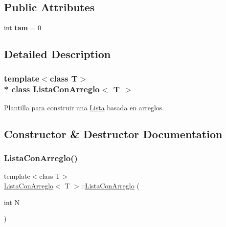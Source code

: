 \subsection*{Public Attributes}
\begin{DoxyCompactItemize}
\item 
\hypertarget{class_lista_con_arreglo_a7b1a9c6334db75f4ffb023a95b01e3f4}{}\label{class_lista_con_arreglo_a7b1a9c6334db75f4ffb023a95b01e3f4} 
int {\bfseries tam} = 0
\end{DoxyCompactItemize}


\subsection{Detailed Description}
\subsubsection*{template$<$class T$>$\\*
class Lista\+Con\+Arreglo$<$ T $>$}

Plantilla para construir una \hyperlink{class_lista}{Lista} basada en arreglos. 

\subsection{Constructor \& Destructor Documentation}
\hypertarget{class_lista_con_arreglo_a9541812a0019b76c6529184356913a59}{}\label{class_lista_con_arreglo_a9541812a0019b76c6529184356913a59} 
\subsubsection{\texorpdfstring{Lista\+Con\+Arreglo()}{ListaConArreglo()}\hspace{0.1cm}{\footnotesize\ttfamily [1/2]}}
{\ttfamily template$<$class T$>$ \\
\hyperlink{class_lista_con_arreglo}{Lista\+Con\+Arreglo}$<$ T $>$\+::\hyperlink{class_lista_con_arreglo}{Lista\+Con\+Arreglo} (\begin{DoxyParamCaption}\item[{int}]{N }\end{DoxyParamCaption})\hspace{0.3cm}{\ttfamily [inline]}}



